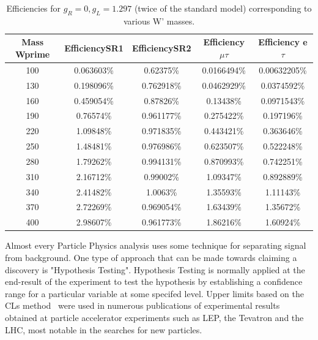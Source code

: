  \begin{table}[htb]
 	\centering
  	\begin{tabular}{|ccccc|}
  		\hline 
  		Mass Wprime  & EfficiencySR1  & EfficiencySR2 & Efficiency $\mu$$\tau$ & Efficiency e $\tau$ \\
 \hline 
100& 0.063603\%& 0.62375\%& 0.0166494\%& 0.00632205\%\\
130& 0.198096\%& 0.762918\%& 0.0462929\%& 0.0374592\%\\
160& 0.459054\%& 0.87826\%& 0.13438\%& 0.0971543\%\\
190& 0.76574\%& 0.961177\%& 0.275422\%& 0.197196\%\\
220& 1.09848\%& 0.971835\%& 0.443421\%& 0.363646\%\\
250& 1.48481\%& 0.976986\%& 0.623507\%& 0.522248\%\\
280& 1.79262\%& 0.994131\%& 0.870993\%& 0.742251\%\\
310& 2.16712\%& 0.99002\%& 1.09347\%& 0.892889\%\\
340& 2.41482\%& 1.0063\%& 1.35593\%& 1.11143\%\\
370& 2.72269\%&0.969054\%& 1.63439\%& 1.35672\%\\
400& 2.98607\%& 0.961773\%& 1.86216\%& 1.60924\%\\
  	
  	\hline
  	\end{tabular}
  	\caption{Efficiencies for $ g_R=0 , g_L=1.297 $ (twice of the standard model) corresponding to various W' masses. \label{eff-twice} }
  \end{table}
  

   

Almost every Particle Physics analysis uses some technique for separating signal from background. One type of approach that can be made towards claiming a discovery is "Hypothesis Testing". Hypothesis Testing is normally applied at the end-result of the experiment to test the hypothesis by establishing a confidence range for a particular variable at some specifed level. Upper limits based on the CLs method~\cite{0954-3899-28-10-313,Mistlberger:2012rs} were used in numerous publications of experimental results obtained at particle accelerator experiments such as LEP, the Tevatron and the LHC, most notable in the searches for new particles. 


